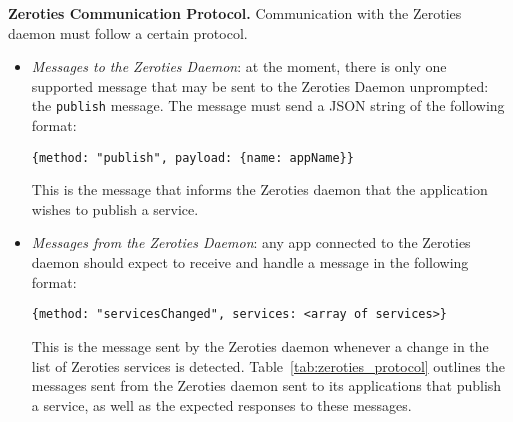 


\textbf{Zeroties Communication Protocol.} Communication with the Zeroties daemon must follow a certain protocol.

\begin{itemize}
\item \textit{Messages to the Zeroties Daemon}: at the moment, there is only one supported message that may be sent to the Zeroties Daemon unprompted: the \texttt{publish} message.
The message must send a JSON string of the following format: 
\begin{lstlisting}[breaklines]
{method: "publish", payload: {name: appName}}
\end{lstlisting}
This is the message that informs the Zeroties daemon that the application wishes to publish a service.
\item \textit{Messages from the Zeroties Daemon}: any app connected to the Zeroties daemon should expect to receive and handle a message in the following format:
\begin{lstlisting}[breaklines]
{method: "servicesChanged", services: <array of services>}
\end{lstlisting}
This is the message sent by the Zeroties daemon whenever a change in the list of Zeroties services is detected.
Table~\ref{tab:zeroties_protocol} outlines the messages sent from the Zeroties daemon sent to its applications that publish a service, as well as the expected responses to these messages.
\end{itemize}


